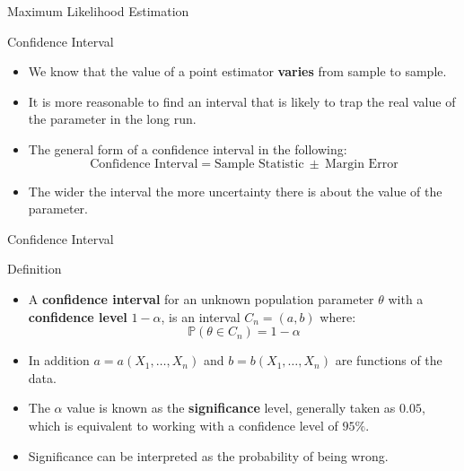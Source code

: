 \documentclass[handout]{beamer}
\begin{document}
\begin{frame}{Maximum Likelihood Estimation}
 
\end{frame}



\begin{frame}{Confidence Interval}
\scriptsize{
\begin{itemize}
 \item We know that the value of a point estimator \textbf{varies} from sample to sample.
 \item It is more reasonable to find an interval that is likely to trap the real value of the parameter in the long run.
 \item The general form of a confidence interval in the following:
  \begin{displaymath}
   \text{Confidence Interval} = \text{Sample Statistic} \ \pm \ \text{Margin Error}
  \end{displaymath}
 \item The wider the interval the more uncertainty there is about the value of the parameter.
\end{itemize}


}
 
\end{frame}


\begin{frame}{Confidence Interval }
\scriptsize{

\begin{block}{Definition}
\begin{itemize}
 \item A \textbf{confidence interval} for an unknown population parameter $\theta$ with a \textbf{confidence level} $1-\alpha$, is an interval $C_n = (a,b)$ where:
 \begin{displaymath}
 \mathbb{P}(\theta \in C_n) = 1-\alpha
\end{displaymath}
 \item In addition $a= a(X_1, \dots, X_n)$ and $b=b(X_1,\dots,X_n)$ are functions of the data.
 \item The $\alpha$ value is known as the \textbf{significance} level, generally taken as $0.05$, which is equivalent to working with a confidence level of $95\%$.
 \item Significance can be interpreted as the probability of being wrong.
\end{itemize}

\end{block}

}
 
\end{frame}
\end{document}
